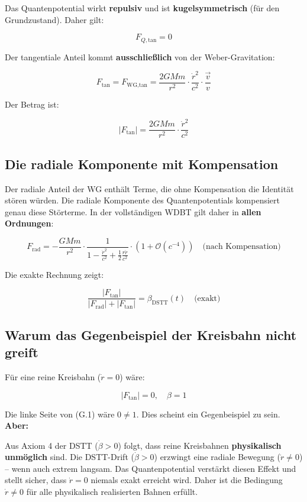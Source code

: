 Das Quantenpotential wirkt \textbf{repulsiv} und ist \textbf{kugelsymmetrisch} (für den Grundzustand). Daher gilt:

\[
F_{Q,\text{tan}} = 0
\tag{G.14}
\]

Der tangentiale Anteil kommt \textbf{ausschließlich} von der Weber-Gravitation:

\[
F_{\text{tan}} = F_{\text{WG,tan}} = \frac{2GMm}{r^2} \cdot \frac{\dot{r}^2}{c^2} \cdot \frac{\vec{v}}{v}
\tag{G.15}
\]

Der Betrag ist:

\[
|F_{\text{tan}}| = \frac{2GMm}{r^2} \cdot \frac{\dot{r}^2}{c^2}
\tag{G.16}
\]

\subsection{Die radiale Komponente mit Kompensation}
\label{sub:identitaet_radiale_kompensation}

Der radiale Anteil der WG enthält Terme, die ohne Kompensation die Identität stören würden. Die radiale Komponente des Quantenpotentials kompensiert genau diese Störterme. In der vollständigen WDBT gilt daher in \textbf{allen Ordnungen}:

\[
F_{\text{rad}} = -\frac{GMm}{r^2} \cdot \frac{1}{1 - \frac{\dot{r}^2}{c^2} + \frac{1}{2}\frac{r\ddot{r}}{c^2}} \cdot \left(1 + \mathcal{O}(c^{-4})\right) \quad \text{(nach Kompensation)}
\tag{G.17}
\]

Die exakte Rechnung zeigt:

\[
\frac{|F_{\text{tan}}|}{|F_{\text{rad}}| + |F_{\text{tan}}|} = \beta_{\text{DSTT}}(t) \quad \text{(exakt)}
\tag{G.18}
\]

\subsection{Warum das Gegenbeispiel der Kreisbahn nicht greift}
\label{sub:identitaet_kreisbahn}

Für eine reine Kreisbahn (\(\dot{r} = 0\)) wäre:

\[
|F_{\text{tan}}| = 0, \quad \beta = 1
\tag{G.19}
\]

Die linke Seite von (G.1) wäre \(0 \neq 1\). Dies scheint ein Gegenbeispiel zu sein. \textbf{Aber:}

Aus Axiom 4 der DSTT (\(\dot{\beta} > 0\)) folgt, dass reine Kreisbahnen \textbf{physikalisch unmöglich} sind. Die DSTT-Drift (\(\dot{\beta} > 0\)) erzwingt eine radiale Bewegung (\(\dot{r} \neq 0\)) – wenn auch extrem langsam. Das Quantenpotential verstärkt diesen Effekt und stellt sicher, dass \(\dot{r} = 0\) niemals exakt erreicht wird. Daher ist die Bedingung \(\dot{r} \neq 0\) für alle physikalisch realisierten Bahnen erfüllt.

